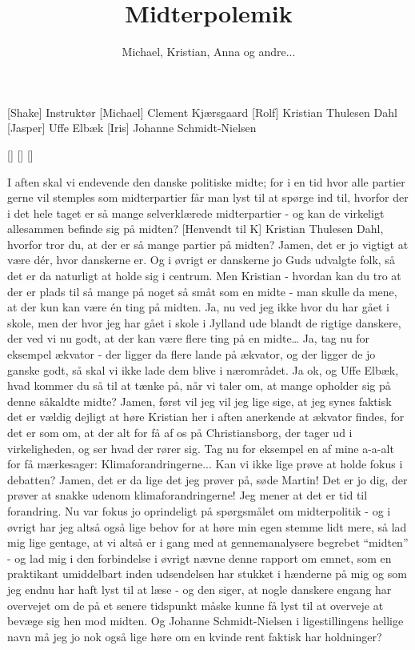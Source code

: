 \documentclass[a4paper,11pt]{article}
\title{Midterpolemik}
\author{Michael, Kristian, Anna og andre...}
\begin{document}
\maketitle

\begin{roles}
[Shake] Instruktør
[Michael] Clement Kjærsgaard
[Rolf] Kristian Thulesen Dahl
[Jasper] Uffe Elbæk
[Iris] Johanne Schmidt-Nielsen
\end{roles}

\begin{props}
[]
[]
[]
\end{props}

\begin{sketch}
 I aften skal vi endevende den danske politiske midte; for i en tid hvor alle partier gerne vil stemples som midterpartier får man lyst til at spørge ind til, hvorfor der i det hele taget er så mange selverklærede midterpartier - og kan de virkeligt allesammen befinde sig på midten?
[Henvendt til K] Kristian Thulesen Dahl, hvorfor tror du, at der er så mange partier på midten?
 Jamen, det er jo vigtigt at være dér, hvor danskerne er. Og i øvrigt er danskerne jo Guds udvalgte folk, så det er da naturligt at holde sig i centrum.
 Men Kristian - hvordan kan du tro at der er plads til så mange på noget så småt som en midte - man skulle da mene, at der kun kan være én ting på midten.
 Ja, nu ved jeg ikke hvor du har gået i skole, men der hvor jeg har gået i skole i Jylland ude blandt de rigtige danskere, der ved vi nu godt, at der kan være flere ting på en midte… Ja, tag nu for eksempel ækvator - der ligger da flere lande på ækvator, og der ligger de jo ganske godt, så skal vi ikke lade dem blive i nærområdet.
 Ja ok, og Uffe Elbæk, hvad kommer du så til at tænke på, når vi taler om, at mange opholder sig på denne såkaldte midte?
 Jamen, først vil jeg vil jeg lige sige, at jeg synes faktisk det er vældig dejligt at høre Kristian her i aften anerkende at ækvator findes, for det er som om, at der alt for få af os på Christiansborg, der tager ud i virkeligheden, og ser hvad der rører sig. Tag nu for eksempel en af mine a-a-alt for få mærkesager: Klimaforandringerne...
 Kan vi ikke lige prøve at holde fokus i debatten?
 Jamen, det er da lige det jeg prøver på, søde Martin! Det er jo dig, der prøver at snakke udenom klimaforandringerne! Jeg mener at det er tid til forandring.
 Nu var fokus jo oprindeligt på spørgsmålet om midterpolitik - og i øvrigt har jeg altså også lige behov for at høre min egen stemme lidt mere, så lad mig lige gentage, at vi altså er i gang med at gennemanalysere begrebet “midten” - og lad mig i den forbindelse i øvrigt nævne denne rapport om emnet, som en praktikant umiddelbart inden udsendelsen har stukket i hænderne på mig og som jeg endnu har haft lyst til at læse - og den siger, at nogle danskere engang har overvejet om de på et senere tidspunkt måske kunne få lyst til at overveje at bevæge sig hen mod midten. Og Johanne Schmidt-Nielsen i ligestillingens hellige navn må jeg jo nok også lige høre om en kvinde rent faktisk har holdninger?

\end{sketch}
\end{document}

